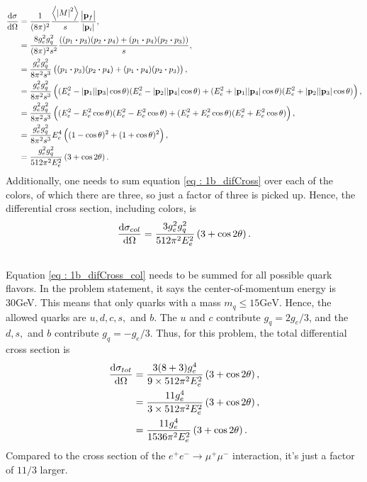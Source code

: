 \documentclass[
a4paper,
10pt,
twoside,
prd,
aps,
nofootinbib,
superscriptaddress,
floatfix,
preprintnumbers,
]{article}
\begin{document}
\begin{align}
    \dv{\sigma}{\Omega} &= \frac{1}{(8\pi)^2} \frac{\ev{\abs{M}^2}}{s}\frac{\abs{\vb{p}_f}}{\abs{\vb{p}_i}},\\
    &= \frac{8g_e^2g_q^2}{(8\pi)^2 s^2} \frac{((p_1\vdot p_3)(p_2\vdot p_4) + (p_1\vdot p_4)(p_2\vdot p_3))}{s},\\
    &= \frac{g_e^2g_q^2}{8\pi^2 s^3}\left((p_1\vdot p_3)(p_2\vdot p_4) + (p_1\vdot p_4)(p_2\vdot p_3)\right),\\
    &= \frac{g_e^2g_q^2}{8\pi^2 s^3} \left((E_e^2 - \abs{\vb{p}_1}\abs{\vb{p}_3}\cos\theta)(E_e^2 - \abs{\vb{p}_2}\abs{\vb{p}_4}\cos\theta) + (E_e^2 + \abs{\vb{p}_1}\abs{\vb{p}_4}\cos\theta)(E_e^2 + \abs{\vb{p}_2}\abs{\vb{p}_3}\cos\theta)\right),\\
    &= \frac{g_e^2g_q^2}{8\pi^2 s^3} \left((E_e^2 - E_e^2\cos\theta)(E_e^2 - E_e^2\cos\theta) + (E_e^2 + E_e^2\cos\theta)(E_e^2 + E_e^2\cos\theta)\right),\\
    &= \frac{g_e^2g_q^2}{8\pi^2 s^3} E_e^4\left((1 - \cos\theta)^2+(1 + \cos\theta)^2\right),\\
    &= \frac{g_e^2g_q^2}{512\pi^2 E_e^2} \left(3+\cos 2\theta\right).
		\label{eq : 1b_difCross}
\end{align}
Additionally, one needs to sum equation \ref{eq : 1b_difCross} over each of the colors, of which there are three, so just a factor of three is picked up.
Hence, the differential cross section, including colors, is
\begin{equation}
	\dv{\sigma_{col}}{\Omega} = \frac{3g_e^2g_q^2}{512\pi^2 E_e^2} \left(3+\cos 2\theta\right).
	\label{eq : 1b_difCross_col}
\end{equation}


\subsection{}
Equation \ref{eq : 1b_difCross_col} needs to be summed for all possible quark flavors.
In the problem statement, it says the center-of-momentum energy is 30GeV.
This means that only quarks with a mass $m_q \leq 15\text{GeV}$.
Hence, the allowed quarks are $u,d,c,s,$ and $b$.
The $u$ and $c$ contribute $g_q = 2g_e/3$, and the $d,s,$ and $b$ contribute $g_q = -g_e/3$.
Thus, for this problem, the total differential cross section is
\begin{align}
	\dv{\sigma_{tot}}{\Omega} &= \frac{3(8+3)g_e^4}{9 \times 512\pi^2 E_e^2} \left(3+\cos 2\theta\right),\\
	&= \frac{11g_e^4}{3 \times 512\pi^2 E_e^2} \left(3+\cos 2\theta\right),\\
	&= \frac{11g_e^4}{1536\pi^2 E_e^2} \left(3+\cos 2\theta\right).
	\label{eq : 1c_difCross_tot}
\end{align}
Compared to the cross section of the $e^+e^- \rightarrow \mu^+\mu^-$ interaction, it's just a factor of $11/3$ larger.
\end{document}
